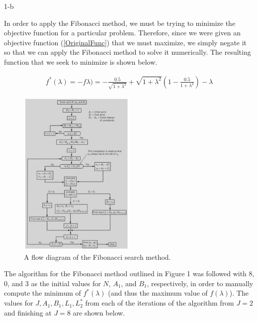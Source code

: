 \documentclass[11pt]{article}
\begin{document}
\begin{prob}{1-b}
\end{prob}
\begin{sol} 

In order to apply the Fibonacci method, we must be trying to minimize the objective function for a particular problem. Therefore, since we were given an objective function (\ref{OriginalFunc}) that we must maximize, we simply negate it so that we can apply the Fibonacci method to solve it numerically. The resulting function that we seek to minimize is shown below.

\begin{eqnarray*}
f^*(\lambda) = -f\lambda) =-\frac{0.5}{\sqrt{1+\lambda^2}}+\sqrt{1+\lambda^2} \left(1-\frac{0.5}{1+\lambda^2}\right)-\lambda
\end{eqnarray*}

\begin{center}
\begin{figure}[h!]
        \label{FibFig}
        \centering
                \includegraphics[width=0.5\textwidth]{fib.jpg}
        \caption{A flow diagram of the Fibonacci search method.}
\end{figure}
\end{center}

The algorithm for the Fibonacci method outlined in Figure 1 was followed with $8$, $0$, and $3$ as the initial values for $N$, $A_1$, and $B_1$, respectively, in order to manually compute the minimum of $f^*(\lambda)$ (and thus the maximum value of $f(\lambda)$). The values for $J, A_{1}, B_{1}, L_{1}, L_{2}^*$ from each of the iterations of the algorithm from $J=2$ and finishing at $J=8$ are shown below. \\


\end{sol}
\end{document}
